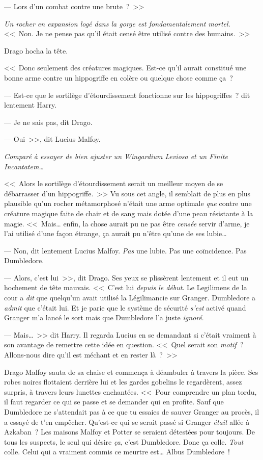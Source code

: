 --- Lors d'un combat contre une brute~?~>>

\emph{Un rocher en expansion logé dans la gorge est fondamentalement mortel.} <<~Non. Je ne pense pas qu'il était censé être utilisé contre des humains.~>>

Drago hocha la tête.

<<~Donc seulement des créatures magiques. Est-ce qu'il aurait constitué une bonne arme contre un hippogriffe en colère ou quelque chose comme ça~?

--- Est-ce que le sortilège d'étourdissement fonctionne sur les hippogriffes~? dit lentement Harry.

--- Je ne sais pas, dit Drago.

--- Oui~>>, dit Lucius Malfoy.

\emph{Comparé à essayer de bien ajuster un Wingardium Leviosa et un Finite Incantatem…}

<<~Alors le sortilège d'étourdissement serait un meilleur moyen de se débarrasser d'un hippogriffe.~>> Vu sous cet angle, il semblait de plus en plus plausible qu'un rocher métamorphosé n'était une arme optimale \emph{que} contre une créature magique faite de chair et de sang mais dotée d'une peau résistante à la magie. <<~Mais… enfin, la chose aurait pu ne pas être \emph{censée} servir d'arme, je l'ai utilisé d'une façon étrange, ça aurait pu n'être qu'une de ses lubie…

--- Non, dit lentement Lucius Malfoy. \emph{Pas} une lubie. Pas une coïncidence. Pas Dumbledore.

--- Alors, c'est lui~>>, dit Drago. Ses yeux se plissèrent lentement et il eut un hochement de tête mauvais. <<~C'est lui \emph{depuis le début}. Le Legilimens de la cour a \emph{dit} que quelqu'un avait utilisé la Légilimancie sur Granger. Dumbledore a \emph{admit} que c'était lui. Et je parie que le système de sécurité \emph{s'est} activé quand Granger m'a lancé le sort mais que Dumbledore l'a juste \emph{ignoré}.

--- Mais…~>> dit Harry. Il regarda Lucius en se demandant si c'était vraiment à son avantage de remettre cette idée en question. <<~Quel serait son \emph{motif}~? Allons-nous dire qu'il est méchant et en rester là~?~>>

Drago Malfoy sauta de sa chaise et commença à déambuler à travers la pièce. Ses robes noires flottaient derrière lui et les gardes gobelins le regardèrent, assez surpris, à travers leurs lunettes enchantées. <<~Pour comprendre un plan tordu, il faut regarder ce qui se passe et se demander qui en profite. Sauf que Dumbledore ne s'attendait pas à ce que tu essaies de sauver Granger au procès, il a essayé de t'en empêcher. Qu'est-ce qui se serait passé si Granger \emph{était} allée à Azkaban~? Les maisons Malfoy et Potter se seraient détestées pour toujours. De tous les suspects, le seul qui désire \emph{ça}, c'est Dumbledore. Donc ça colle. \emph{Tout} colle. Celui qui a vraiment commis ce meurtre est… Albus Dumbledore~!

